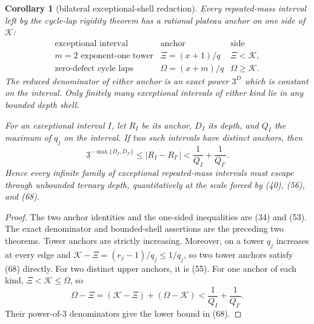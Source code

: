 \documentclass[11pt]{article}
\newtheorem{corollary}[theorem]{Corollary}
\begin{document}
\begin{corollary}[bilateral exceptional-shell reduction]
Every repeated-mass interval left by the cycle-lap rigidity theorem has a
rational plateau anchor on one side of $\mathcal K$:
\[
\begin{array}{c|c|c}
\text{exceptional interval}&\text{anchor}&\text{side}\ \\ \hline
m=2\text{ exponent-one tower}&\Xi=(x+1)/q&\Xi<\mathcal K,\\
\text{zero-defect cycle laps}&\Omega=(x+m)/q&\Omega\geq\mathcal K.
\end{array}
\tag{67}
\]
The reduced denominator of either anchor is an exact power $3^D$ which is
constant on the interval.  Only finitely many exceptional intervals of
either kind lie in any bounded depth shell.

For an exceptional interval $I$, let $R_I$ be its anchor, $D_I$ its depth,
and $Q_I$ the maximum of $q_j$ on the interval.  If two such intervals have
distinct anchors, then
\[
\boxed{
  3^{-\max\{D_I,D_{I'}\}}
  \leq|R_I-R_{I'}|
  <\frac1{Q_I}+\frac1{Q_{I'}}.}
\tag{68}
\]
Hence every infinite family of exceptional repeated-mass intervals must
escape through unbounded ternary depth, quantitatively at the scale forced
by (40), (56), and (68).
\end{corollary}

\begin{proof}
The two anchor identities and the one-sided inequalities are (34) and (53).
The exact denominator and bounded-shell assertions are the preceding two
theorems.  Tower anchors are strictly increasing.  Moreover, on a tower
$q_j$ increases at every edge and
$\mathcal K-\Xi=(e_j-1)/q_j\leq1/q_j$, so two tower anchors satisfy (68)
directly.  For two distinct upper anchors, it is (55).  For one anchor of
each kind, $\Xi<\mathcal K\leq\Omega$, so
\[
  \Omega-\Xi
  =(\mathcal K-\Xi)+(\Omega-\mathcal K)
  <\frac1{Q_I}+\frac1{Q_{I'}}.
\]
Their power-of-$3$ denominators give the lower bound in (68).
\end{proof}
\end{document}
